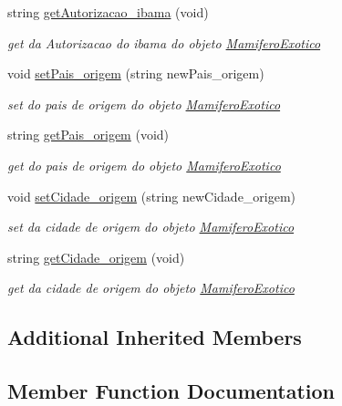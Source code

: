 \begin{DoxyCompactItemize}
string \mbox{\hyperlink{class_mamifero_exotico_a0827707f5c5b7e65714a791c07d43ece}{get\+Autorizacao\+\_\+ibama}} (void)
\begin{DoxyCompactList}\small\item\em get da Autorizacao do ibama do objeto \mbox{\hyperlink{class_mamifero_exotico}{Mamifero\+Exotico}} \end{DoxyCompactList}\item 
void \mbox{\hyperlink{class_mamifero_exotico_a7d01fddb042cad93fdf65d6ffd235ec8}{set\+Pais\+\_\+origem}} (string new\+Pais\+\_\+origem)
\begin{DoxyCompactList}\small\item\em set do pais de origem do objeto \mbox{\hyperlink{class_mamifero_exotico}{Mamifero\+Exotico}} \end{DoxyCompactList}\item 
string \mbox{\hyperlink{class_mamifero_exotico_a007b102f26f2d16b68d8981d69470a9c}{get\+Pais\+\_\+origem}} (void)
\begin{DoxyCompactList}\small\item\em get do pais de origem do objeto \mbox{\hyperlink{class_mamifero_exotico}{Mamifero\+Exotico}} \end{DoxyCompactList}\item 
void \mbox{\hyperlink{class_mamifero_exotico_a1f94a59bbdab189a39fdffcf278d9ca7}{set\+Cidade\+\_\+origem}} (string new\+Cidade\+\_\+origem)
\begin{DoxyCompactList}\small\item\em set da cidade de origem do objeto \mbox{\hyperlink{class_mamifero_exotico}{Mamifero\+Exotico}} \end{DoxyCompactList}\item 
string \mbox{\hyperlink{class_mamifero_exotico_ab210e7210e383f5ab553b6ff8ccd5475}{get\+Cidade\+\_\+origem}} (void)
\begin{DoxyCompactList}\small\item\em get da cidade de origem do objeto \mbox{\hyperlink{class_mamifero_exotico}{Mamifero\+Exotico}} \end{DoxyCompactList}\end{DoxyCompactItemize}
\subsection*{Additional Inherited Members}


\subsection{Member Function Documentation}
\mbox{\label{class_mamifero_exotico_a0827707f5c5b7e65714a791c07d43ece}} 
